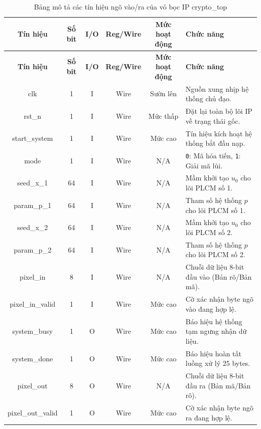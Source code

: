 \begin{longtable}{|c|c|c|c|c|p{5cm}|}
	\caption{Bảng mô tả các tín hiệu ngõ vào/ra của vỏ bọc IP crypto\_top}
	\label{bang_crypto_top} \\
	\hline
	\textbf{Tín hiệu} & \textbf{Số bit} & \textbf{I/O} & \textbf{Reg/Wire} & \textbf{Mức hoạt động} & \textbf{Chức năng} \\ \hline
	\endfirsthead
	
	\hline
	\textbf{Tín hiệu} & \textbf{Số bit} & \textbf{I/O} & \textbf{Reg/Wire} & \textbf{Mức hoạt động} & \textbf{Chức năng} \\ \hline
	\endhead
	
	\hline
	\endlastfoot
	
	clk              & 1  & I & Wire & Sườn lên  & Nguồn xung nhịp hệ thống chủ đạo. \\ \hline
	rst\_n           & 1  & I & Wire & Mức thấp  & Đặt lại toàn bộ lõi IP về trạng thái gốc. \\ \hline
	start\_system    & 1  & I & Wire & Mức cao   & Tín hiệu kích hoạt hệ thống bắt đầu nạp. \\ \hline
	mode             & 1  & I & Wire & N/A       & \texttt{0}: Mã hóa tiến, \texttt{1}: Giải mã lùi. \\ \hline
	seed\_x\_1       & 64 & I & Wire & N/A       & Mầm khởi tạo $u_0$ cho lõi PLCM số 1. \\ \hline
	param\_p\_1      & 64 & I & Wire & N/A       & Tham số hệ thống $p$ cho lõi PLCM số 1. \\ \hline
	seed\_x\_2       & 64 & I & Wire & N/A       & Mầm khởi tạo $u_0$ cho lõi PLCM số 2. \\ \hline
	param\_p\_2      & 64 & I & Wire & N/A       & Tham số hệ thống $p$ cho lõi PLCM số 2. \\ \hline
	pixel\_in        & 8  & I & Wire & N/A       & Chuỗi dữ liệu 8-bit đầu vào (Bản rõ/Bản mã). \\ \hline
	pixel\_in\_valid & 1  & I & Wire & Mức cao   & Cờ xác nhận byte ngõ vào đang hợp lệ. \\ \hline
	system\_busy     & 1  & O & Wire & Mức cao   & Báo hiệu hệ thống tạm ngưng nhận dữ liệu. \\ \hline
	system\_done     & 1  & O & Wire & Mức cao   & Báo hiệu hoàn tất luồng xử lý 25 bytes. \\ \hline
	pixel\_out       & 8  & O & Wire & N/A       & Chuỗi dữ liệu 8-bit đầu ra (Bản mã/Bản rõ). \\ \hline
	pixel\_out\_valid& 1  & O & Wire & Mức cao   & Cờ xác nhận byte ngõ ra đang hợp lệ. \\ 
\end{longtable}


